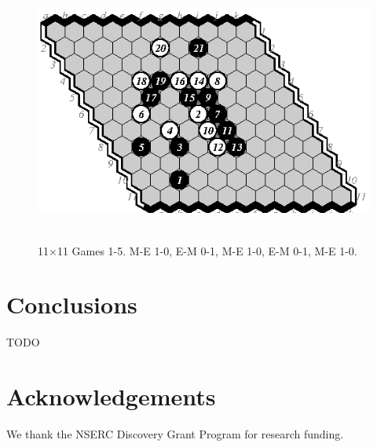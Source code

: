 \documentclass{IOS-Book-Article}
\begin{document}
\begin{figure}
\noindent\hfill\includegraphics[width=.58\columnwidth]{pix/11-05-me}\hfill\ 
\caption{11$\times$11 Games 1-5. M-E 1-0, E-M 0-1, M-E 1-0, E-M 0-1, M-E 1-0.}
\end{figure}

\section{Conclusions}
TODO

\section*{Acknowledgements}
We thank the NSERC Discovery Grant Program for research funding.


\end{document}
